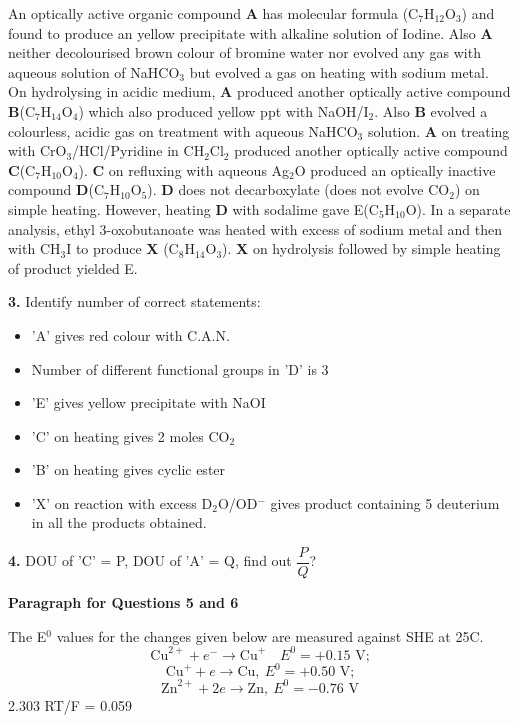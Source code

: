 \documentclass[10pt,twocolumn]{extarticle}
\begin{document}
An optically active organic compound \textbf{A} has molecular formula (C$_7$H$_{12}$O$_3$) and found to produce an yellow precipitate with alkaline solution of Iodine. Also \textbf{A} neither decolourised brown colour of bromine water nor evolved any gas with aqueous solution of NaHCO$_3$ but evolved a gas on heating with sodium metal. On hydrolysing in acidic medium, \textbf{A} produced another optically active compound \textbf{B}(C$_7$H$_{14}$O$_4$) which also produced yellow ppt with NaOH/I$_2$. Also \textbf{B} evolved a colourless, acidic gas on treatment with aqueous NaHCO$_3$ solution. \textbf{A} on treating with CrO$_3$/HCl/Pyridine in CH$_2$Cl$_2$ produced another optically active compound \textbf{C}(C$_7$H$_{10}$O$_4$). \textbf{C} on refluxing with aqueous Ag$_2$O produced an optically inactive compound \textbf{D}(C$_7$H$_{10}$O$_5$). \textbf{D} does not decarboxylate (does not evolve CO$_2$) on simple heating. However, heating \textbf{D} with sodalime gave E(C$_5$H$_{10}$O). In a separate analysis, ethyl 3-oxobutanoate was heated with excess of sodium metal and then with CH$_3$I to produce \textbf{X} (C$_8$H$_{14}$O$_3$). \textbf{X} on hydrolysis followed by simple heating of product yielded E.

\textbf{3.} Identify number of correct statements:

\begin{itemize}[leftmargin=1.6em,itemsep=1pt,topsep=2pt]
\item[(1)] 'A' gives red colour with C.A.N.
\item[(2)] Number of different functional groups in 'D' is 3
\item[(3)] 'E' gives yellow precipitate with NaOI
\item[(4)] 'C' on heating gives 2 moles CO$_2$
\item[(5)] 'B' on heating gives cyclic ester
\item[(6)] 'X' on reaction with excess D$_2$O/OD$^-$ gives product containing 5 deuterium in all the products obtained.
\end{itemize}

\textbf{4.} DOU of 'C' = P, DOU of 'A' = Q, find out $\dfrac PQ$?

\textbf{Paragraph for Questions 5 and 6}

The E$^0$ values for the changes given below are measured against SHE at 25\textdegree C.
$$\text{Cu}^{2+}+e^-\to\text{Cu}^+\quad E^0=+0.15\text{ V;}$$
$$\text{Cu}^++e\to\text{Cu},\ E^0=+0.50\text{ V;}$$
$$\text{Zn}^{2+}+2e\to\text{Zn},\ E^0=-0.76\text{ V}$$
2.303 RT/F = 0.059
\end{document}
